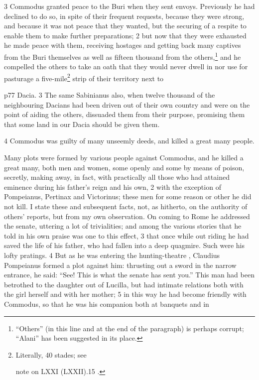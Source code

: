 3
Commodus granted peace to the Buri when they sent envoys. Previously he had declined to do so, in spite of their frequent requests, because they were strong, and because it was not peace that they wanted, but the securing of a respite to enable them to make further preparations; 2 but now that they were exhausted he made peace with them, receiving hostages and getting back many captives from the Buri themselves as well as fifteen thousand from the others,\texthebrew{⁠}\footnote{``Others'' (in this line and at the end of the paragraph) is perhaps corrupt; ``Alani'' has been suggested in its place.

} and he compelled the others to take an oath that they would never dwell in nor use for pasturage a five-mile\texthebrew{⁠}\footnote{Literally, 40 stades; see

note on LXXI (LXXII).15 .

} strip of their territory next to

p77 Dacia. 3 The same Sabinianus also, when twelve thousand of the neighbouring Dacians had been driven out of their own country and were on the point of aiding the others, dissuaded them from their purpose, promising them that some land in our Dacia should be given them.

4
Commodus was guilty of many unseemly deeds, and killed a great many people.

Many plots were formed by various people against Commodus, and he killed a great many, both men and women, some openly and some by means of poison, secretly, making away, in fact, with practically all those who had attained eminence during his father's reign and his own, 2 with the exception of Pompeianus, Pertinax and Victorinus; these men for some reason or other he did not kill. I state these and subsequent facts, not, as hitherto, on the authority of others' reports, but from my own observation. On coming to Rome he addressed the senate, uttering a lot of trivialities; and among the various stories that he told in his own praise was one to this effect, 3 that once while out riding he had saved the life of his father, who had fallen into a deep quagmire. Such were his lofty pratings. 4 But as he was entering the hunting-theatre , Claudius Pompeianus formed a plot against him: thrusting out a sword in the narrow entrance, he said: ``See! This is what the senate has sent you.'' This man had been betrothed to the daughter out of Lucilla, but had intimate relations both with the girl herself and with her mother; 5 in this way he had become friendly with Commodus, so that he was his companion both at banquets and in

